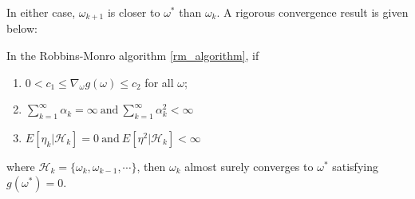   In either case, $\omega_{k+1}$ is closer to $\omega^{*}$ than $\omega_{k}$. A rigorous convergence result is given
  below:
  \begin{theorem}
    \label{rm:1}
    In the Robbins-Monro algorithm \ref{rm_algorithm}, if
    \begin{enumerate}
      \item
            $0<c_{1} \le \nabla_{\omega}g(\omega) \le c_{2}$ for all $\omega$;
      \item
            $\sum_{k=1}^{\infty}\alpha_{k}=\infty \ \text{and} \ \sum_{k=1}^{\infty}\alpha_{k}^{2} < \infty$
      \item
            $E[\eta_{k}| \mathcal{H}_{k}] = 0 \ \text{and} \ E[\eta^{2}|\mathcal{H}_{k}]<\infty$
    \end{enumerate}
    where $\mathcal{H}_{k}= \{\omega_{k},\omega_{k-1},\cdots \}$, then $\omega_{k}$ almost surely converges to
    $\omega^{*}$ satisfying $g(\omega^{*})=0$.
  \end{theorem}

